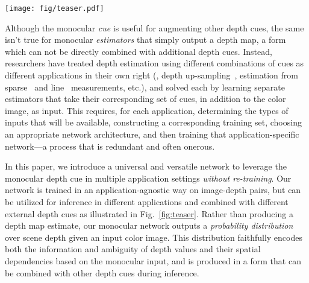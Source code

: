\documentclass[10pt,twocolumn,letterpaper]{article}
\begin{document}
\begin{figure*}[!t]
  \begin{center}
    \texttt{[image: fig/teaser.pdf]}
  \end{center}
  \caption{Overview of our approach. Given an input color image, we use a common task-agnostic network to output a joint probability distribution  over the depth map---formed as a sample approximation using outputs of a conditional VAE that generates plausible estimates for depth in overlapping patches. The mean of this distribution represents a standard monocular depth estimate, but the distribution itself can be used to solve a variety of inference tasks in different application settings---including leveraging additional depth cues to yield improved estimates. All these applications are enabled by a common model, \emph{that is trained only once}.}
  \label{fig:teaser}
\end{figure*}

Although the monocular \emph{cue} is useful for augmenting other depth cues, the same isn't true for monocular \emph{estimators} that simply output a depth map, a form which can not be directly combined with additional depth cues. Instead, researchers have treated depth estimation using different combinations of cues as different applications in their own right (\eg, depth up-sampling~\cite{chen2018estimating}, estimation from sparse~\cite{ma2018sparse} and line~\cite{liao2017sparse} measurements, etc.), and solved each by learning separate estimators that take their corresponding set of cues, in addition to the color image, as input. This requires, for each application, determining the types of inputs that will be available, constructing a corresponding training set, choosing an appropriate network architecture, and then training that application-specific network---a process that is redundant and often onerous.

In this paper, we introduce a universal and versatile network to leverage the monocular depth cue in multiple application settings \emph{without re-training}. Our network is trained in an application-agnostic way on image-depth pairs, but can be utilized for inference in different applications and combined with different external depth cues as illustrated in Fig.~\ref{fig:teaser}. Rather than producing a depth map estimate, our monocular network outputs a \emph{probability distribution} over scene depth given an input color image. This distribution faithfully encodes both the information and ambiguity of depth values and their spatial dependencies based on the monocular input, and is produced in a form that can be combined with other depth cues during inference.
\end{document}
